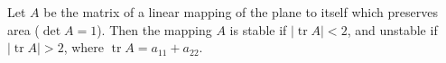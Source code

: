 Let $A$ be the matrix of a linear mapping of the plane to itself which preserves area ($\det A = 1$). Then the mapping $A$ is stable if $|\operatorname{tr} A| < 2$, and unstable if $|\operatorname{tr} A| > 2$, where $\operatorname{tr} A = a_{11} + a_{22}$.
